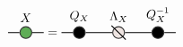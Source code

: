
\renewcommand{\graphTensorSpacing}{1.1}
\renewcommand{\graphTensorTwoStart}{2.25*\graphTensorSpacing}
\[
\begin{tikzpicture}[baseline=-0.65ex]
	\node[circle,draw=black!80,thick,fill=myGreen,label=above:$X$] (X) at (0,0) {};
	\draw[thick, draw=black] (-\graphLineSpacing,0) -- (X) -- (\graphLineSpacing,0) {};
\end{tikzpicture}
=
\begin{tikzpicture}[baseline=-0.65ex]
	\node[circle,draw=black!80,thick,fill=black,label=above:$Q_X$] (Q) at (0,0) {};
	\node[circle,draw=black!80,thick,fill=myGrey,label=above:$\Lambda_X$] (LAMBDA) at (\graphTensorSpacing,0) {};
	\draw[thick] (\graphTensorSpacing - 0.2,0 + 0.2) -- (\graphTensorSpacing + 0.2,0 - 0.2) {};
	\node[circle,draw=black!80,thick,fill=black,label=above:$Q_X^{-1}$] (Q1) at (2*\graphTensorSpacing,0) {};

	\draw[thick, draw=black] (-\graphLineSpacing,0) -- (Q) -- (LAMBDA) -- (Q1) -- (2*\graphTensorSpacing + \graphLineSpacing,0) {};

\end{tikzpicture}
\]